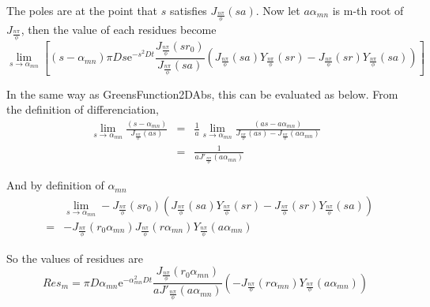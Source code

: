 \documentclass{article}
\begin{document}
The poles are at the point that $s$ satisfies $J_{\frac{n\pi}{\phi}}(sa)$. 
 Now let $a\alpha_{mn}$ is m-th root of $J_{\frac{n\pi}{\phi}}$,
 then the value of each residues become
\begin{equation}
    \lim_{s\to\alpha_{mn}} \left[
       (s-\alpha_{mn})
       \pi Ds\mathrm{e}^{-s^2Dt}
       \frac{J_{\frac{n\pi}{\phi}}(sr_0)}{J_{\frac{n\pi}{\phi}}(sa)}
       \left(J_{\frac{n\pi}{\phi}}(sa)Y_{\frac{n\pi}{\phi}}(sr) -
        J_{\frac{n\pi}{\phi}}(sr)Y_{\frac{n\pi}{\phi}}(sa)\right)
       \right]
\end{equation}

In the same way as GreensFunction2DAbs, this can be evaluated as below.
From the definition of differenciation,
\begin{eqnarray}
    \lim_{s\to\alpha_{mn}}\frac{(s-\alpha_{mn})}{J_{\frac{n\pi}{\phi}}(as)}
    &=& \frac{1}{a} \lim_{s\to\alpha_{mn}} \frac{(as-a\alpha_{mn})}
        {J_{\frac{n\pi}{\phi}}(as) - J_{\frac{n\pi}{\phi}}(a\alpha_{mn})}\nonumber \\
    &=& \frac{1}{aJ'_{\frac{n\pi}{\phi}}(a\alpha_{mn})}\nonumber
\end{eqnarray}

And by definition of $\alpha_{mn}$
\begin{eqnarray}
    & & \lim_{s\to\alpha_{mn}}-J_{\frac{n\pi}{\phi}}(sr_0)
        (J_{\frac{n\pi}{\phi}}(sa)Y_{\frac{n\pi}{\phi}}(sr) -
         J_{\frac{n\pi}{\phi}}(sr)Y_{\frac{n\pi}{\phi}}(sa)) \nonumber \\
    &=& -J_{\frac{n\pi}{\phi}}(r_0\alpha_{mn})
         J_{\frac{n\pi}{\phi}}(r\alpha_{mn})Y_{\frac{n\pi}{\phi}}(a\alpha_{mn})
\end{eqnarray}

So the values of residues are
\begin{equation}\label{residue-values}
    Res_m = 
    \pi D\alpha_{mn}\mathrm{e}^{-\alpha_{mn}^2Dt}
    \frac{J_{\frac{n\pi}{\phi}}(r_0\alpha_{mn})}
         {aJ'_{\frac{n\pi}{\phi}}(a\alpha_{mn})}
       \left(-J_{\frac{n\pi}{\phi}}(r\alpha_{mn})
         Y_{\frac{n\pi}{\phi}}(a\alpha_{mn})\right)
\end{equation}
\end{document}
